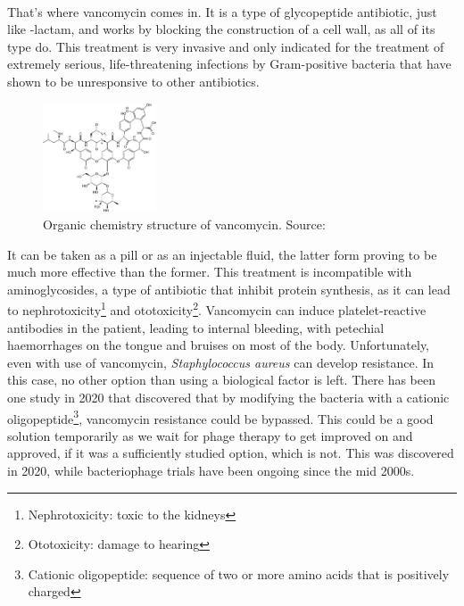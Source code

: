 \paragraph{}That's where vancomycin comes in. It is a type of glycopeptide antibiotic, just like \beta-lactam, and works by blocking the construction of a cell wall, as all of its type do. This treatment is very invasive and only indicated for the treatment of extremely serious, life-threatening infections by Gram-positive bacteria that have shown to be unresponsive to other antibiotics.\begin{figure}\begin{center}\includegraphics[width=0.30\textwidth]{assets/vancomycin.png}\end{center}\caption{Organic chemistry structure of vancomycin. Source: \cite{FileVancomycinSvg2008}}\vspace{0.15\linewidth}\end{figure}\newline It can be taken as a pill or as an injectable fluid, the latter form proving to be much more effective than the former. This treatment is incompatible with aminoglycosides, a type of antibiotic that inhibit protein synthesis, as it can lead to nephrotoxicity\footnote{Nephrotoxicity: toxic to the kidneys} and ototoxicity\footnote{Ototoxicity: damage to hearing}. Vancomycin can induce platelet-reactive antibodies in the patient, leading to internal bleeding, with petechial haemorrhages on the tongue and bruises on most of the body. Unfortunately, even with use of vancomycin, \emph{Staphylococcus aureus} can develop resistance. In this case, no other option than using a biological factor is left. There has been one study in 2020 that discovered that by modifying the bacteria with a cationic oligopeptide\footnote{Cationic oligopeptide: sequence of two or more amino acids that is positively charged}, vancomycin resistance could be bypassed. This could be a good solution temporarily as we wait for phage therapy to get improved on and approved, if it was a sufficiently studied option, which is not. This was discovered in 2020, while bacteriophage trials have been ongoing since the mid 2000s.
